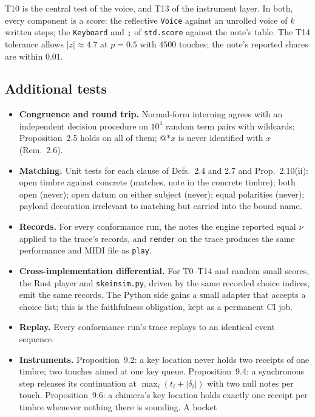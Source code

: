 \documentclass[11pt,a4paper]{article}
\theoremstyle{definition}
\theoremstyle{remark}
\newcommand{\len}[1]{|#1|}
\begin{document}
\noindent T10 is the central test of the voice, and T13 of the instrument layer.
In both, every component is a score: the reflective \texttt{Voice} against an
unrolled voice of $k$ written steps; the \texttt{Keyboard} and \texttt{;} of
\texttt{std.score} against the note's table. The T14 tolerance allows
$|z|\approx 4.7$ at $p=0.5$ with $4500$ touches; the note's reported shares
are within $0.01$.

\subsection{Additional tests}

\begin{itemize}[leftmargin=*,itemsep=2pt]
\item \textbf{Congruence and round trip.} Normal-form interning agrees with an
  independent decision procedure on $10^4$ random term pairs with wildcards;
  Proposition~2.5 holds on all of them; $@{\ast x}$ is never identified with
  $x$ (Rem.~2.6).
\item \textbf{Matching.} Unit tests for each clause of Defs.~2.4 and 2.7 and
  Prop.~2.10(ii): open timbre against concrete (matches, note in the concrete
  timbre); both open (never); open datum on either subject (never); equal
  polarities (never); payload decoration irrelevant to matching but carried
  into the bound name.
\item \textbf{Records.} For every conformance run, the notes the engine
  reported equal $\nu$ applied to the trace's records, and \texttt{render} on the
  trace produces the same performance and MIDI file as \texttt{play}.
\item \textbf{Cross-implementation differential.} For T0--T14 and random small
  scores, the Rust player and \texttt{skeinsim.py}, driven by the same recorded
  choice indices, emit the same records. The Python side gains a small adapter
  that accepts a choice list; this is the faithfulness obligation, kept as a
  permanent CI job.
\item \textbf{Replay.} Every conformance run's trace replays to an identical
  event sequence.
\item \textbf{Instruments.} Proposition~9.2: a key location never holds two
  receipts of one timbre; two touches aimed at one key queue. Proposition~9.4:
  a synchronous step releases its continuation at $\max_i(t_i+\len{\delta_i})$
  with two null notes per touch. Proposition~9.6: a chimera's key location holds
  exactly one receipt per timbre whenever nothing there is sounding. A hocket

\end{itemize}
\end{document}
